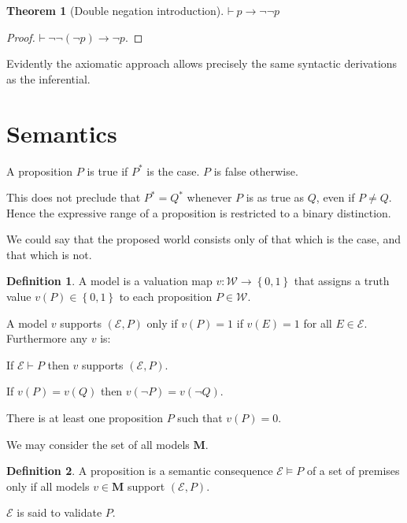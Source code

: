 \documentclass{amsbook}
\newcommand{\setsm}[1]{\left\{#1\right\}}
\newcommand{\wffs}{\mathcal W}
\newcommand{\infers}{\mathrel\vdash}
\newcommand{\theorem}{\mathord\vdash\medspace}
\newcommand{\valids}{\mathrel\vDash}
\newcommand{\then}{\mathrel\rightarrow}
\theoremstyle{definition}
\newtheorem{thm}{Theorem}[section]
\newtheorem{dfn}{Definition}[section]
\begin{document}
\begin{thm}[Double negation introduction]
    $\theorem p \then \neg\neg p$
    \begin{proof}
        $\theorem \neg\neg(\neg p) \then \neg p$.
    \end{proof}
\end{thm}

Evidently the axiomatic approach allows precisely the same syntactic derivations as the inferential.


\section{Semantics}

A proposition $P$ is true if $P^*$ is the case. $P$ is false otherwise.

This does not preclude that $P^* = Q^*$ whenever $P$ is as true as $Q$, even if $P \neq Q$.
Hence the expressive range of a proposition is restricted to a binary distinction.

We could say that the proposed world consists only of that which is the case, and that which is not.

\begin{dfn}
    A model is a valuation map $v: \wffs \longrightarrow \setsm{0,1}$ that assigns a truth value $v(P) \in \setsm{0,1}$ to each proposition $P \in \wffs$.

    A model $v$ supports $(\mathcal E, P)$ only if $v(P) = 1$ if $v(E) = 1$ for all $E \in \mathcal E$. Furthermore any $v$ is:
    \begin{description}[
            labelindent=\parindent,
            before={
                    \renewcommand\makelabel[1]{(##1).}
                }
        ]
        \item [inferential] If $\mathcal E \infers P$ then $v$ supports $(\mathcal E, P)$.
        \item [regular with respect to negation] If $v(P) = v(Q)$ then $v(\neg P) = v(\neg Q)$.
        \item [not trivial] There is at least one proposition $P$ such that $v(P) = 0$.
    \end{description}
    We may consider the set of all models $\mathbf M$.
\end{dfn}

\begin{dfn}
    A proposition is a semantic consequence $\mathcal E \valids P$ of a set of premises only if all models $v \in \mathbf M$ support $(\mathcal E, P)$.

    $\mathcal E$ is said to validate $P$.
\end{dfn}
\end{document}
